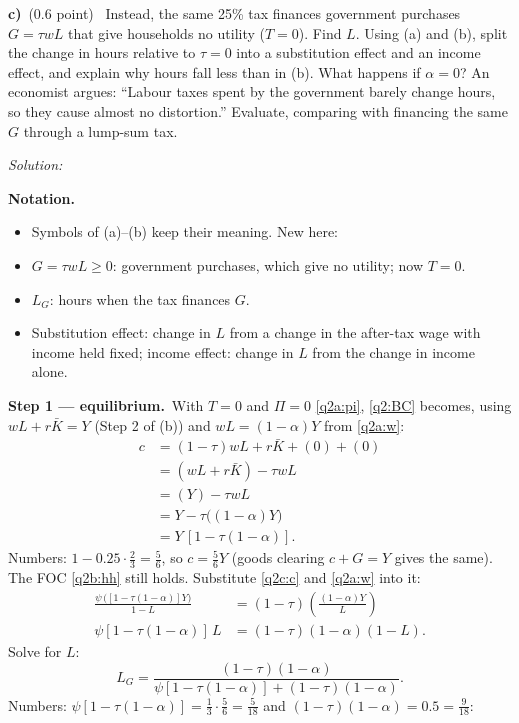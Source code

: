 \documentclass[11pt,a4paper]{article}
\newif\ifsolucoes
\newcommand{\espacoresol}{6cm}
\newcommand{\parte}[2]{\par\Needspace{6\baselineskip}\medskip\noindent\textbf{#1)}~(#2)~}
\newcommand{\resolespaco}{\ifsolucoes\else\par\textit{Solution:}\vspace{\espacoresol}\par\fi}
\newcommand{\passo}[2]{\par\smallskip\noindent\textbf{Step #1.}~#2}
\newenvironment{notacao}{\par\smallskip\noindent\textbf{Notation.}\begin{itemize}[leftmargin=1.4em,topsep=1pt,itemsep=0pt]\small}{\end{itemize}}
\begin{document}
\parte{c}{0.6 point} Instead, the same 25\% tax finances government purchases $G=\tau wL$ that give households
no utility ($T=0$). Find $L$. Using (a) and (b), split the change in hours relative to $\tau=0$ into a substitution
effect and an income effect, and explain why hours fall less than in (b). What happens if $\alpha=0$? An economist
argues: ``Labour taxes spent by the government barely change hours, so they cause almost no distortion.''
Evaluate, comparing with financing the same $G$ through a lump-sum tax.
\resolespaco
\begin{sol}
\begin{notacao}
\item Symbols of (a)--(b) keep their meaning. New here:
\item $G=\tau wL\ge0$: government purchases, which give no utility; now $T=0$.
\item $L_G$: hours when the tax finances $G$.
\item Substitution effect: change in $L$ from a change in the after-tax wage with income held fixed;
income effect: change in $L$ from the change in income alone.
\end{notacao}
\passo{1 --- equilibrium}{With $T=0$ and $\Pi=0$ \eqref{q2a:pi}, \eqref{q2:BC} becomes, using $wL+r\bar K=Y$
(Step 2 of (b)) and $wL=(1-\alpha)Y$ from \eqref{q2a:w}:
\begin{align}
c &= (1-\tau)wL+r\bar K+(0)+(0)\nonumber\\
&= (wL+r\bar K)-\tau wL\nonumber\\
&= (Y)-\tau wL\nonumber\\
&= Y-\tau\big((1-\alpha)Y\big)\nonumber\\
&= Y\,[1-\tau(1-\alpha)]. \label{q2c:c}
\end{align}
Numbers: $1-0.25\cdot\tfrac23=\tfrac56$, so $c=\tfrac56Y$ (goods clearing $c+G=Y$ gives the same).
The FOC \eqref{q2b:hh} still holds. Substitute \eqref{q2c:c} and \eqref{q2a:w} into it:
\begin{align*}
\frac{\psi\,\big([1-\tau(1-\alpha)]Y\big)}{1-L} &= (1-\tau)\left(\frac{(1-\alpha)Y}{L}\right)\\
\psi[1-\tau(1-\alpha)]\,L &= (1-\tau)(1-\alpha)(1-L).
\end{align*}
Solve for $L$:
\begin{equation}
\boxed{L_G=\frac{(1-\tau)(1-\alpha)}{\psi[1-\tau(1-\alpha)]+(1-\tau)(1-\alpha)}}. \label{q2c:LG}
\end{equation}
Numbers: $\psi[1-\tau(1-\alpha)]=\tfrac13\cdot\tfrac56=\tfrac{5}{18}$ and $(1-\tau)(1-\alpha)=0.5=\tfrac{9}{18}$:
}
\end{sol}
\end{document}
